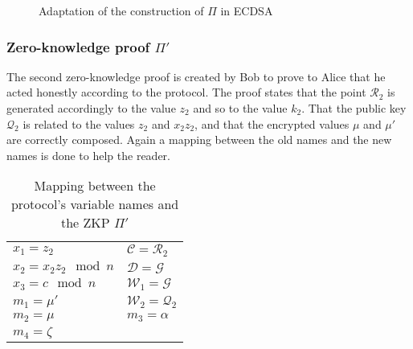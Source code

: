 \begin{figure}[h]
  \caption{Adaptation of the construction of $\Pi$ in ECDSA}
  \label{fig:adaptationOfPi}
\end{figure}

\subsubsection{Zero-knowledge proof $\Pi'$}

The second zero-knowledge proof is created by Bob to prove to Alice that he
acted honestly according to the protocol. The proof states that the point
$\mathcal{R}_2$ is generated accordingly to the value $z_2$ and so to the value
$k_2$. That the public key $\mathcal{Q}_2$ is related to the values $z_2$ and
$x_2z_2$, and that the encrypted values $\mu$ and $\mu'$ are correctly composed.
Again a mapping between the old names and the new names is done to help the
reader.

\begin{table}[h]
  \begin{tabular}{p{4cm} l}
    $x_1 = z_2$ & $\mathcal{C} = \mathcal{R}_2$ \\
    $x_2 = x_2z_2 \mod n$ & $\mathcal{D} = \mathcal{G}$ \\
    $x_3 = c \mod n$ & $\mathcal{W}_1 = \mathcal{G}$ \\
    $m_1 = \mu'$ & $\mathcal{W}_2 = \mathcal{Q}_2$ \\
    $m_2 = \mu$ & $m_3 = \alpha$ \\
    $m_4 = \zeta$ &
  \end{tabular}
  \caption{Mapping between the protocol's variable names and the ZKP $\Pi'$}
  \label{fig:mappingOfVarNamesPi2}
\end{table}

